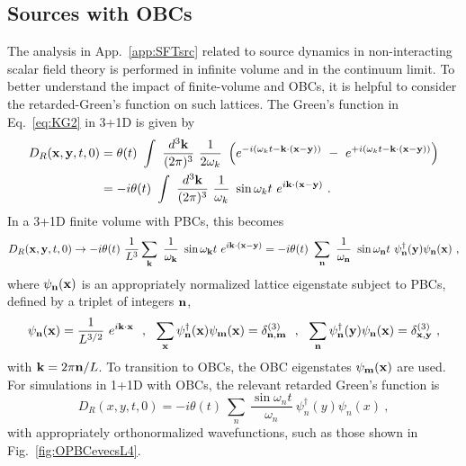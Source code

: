 \documentclass[aps, prc, tightenlines,superscriptaddress, letterpaper, amsmath, amssymb, preprintnumbers, floatfix, longbibliography, nofootinbib]{revtex4-2}
\begin{document}
\subsection{Sources with OBCs}
\label{app:OBCSMsrcs}
\noindent
The analysis in App.~\ref{app:SFTsrc} related to source dynamics in non-interacting scalar field theory is performed in infinite volume and in the continuum limit.
To better understand the impact of finite-volume and OBCs, it is helpful to consider the retarded-Green's function on such lattices.
The Green's function in Eq.~\eqref{eq:KG2} in 3+1D is given by 
%
\begin{align}
D_R({\bf x},{\bf y},t,0) & =
\theta(t)\ 
\int\ \frac{d^3{\bf k}}{(2\pi)^3}\ \frac{1}{2\omega_k}\ 
\left(
e^{-i \left( \omega_k t - {\bf k}\cdot ({\bf x}-{\bf y}) \right)}
\ -\ 
e^{+i \left( \omega_k t - {\bf k}\cdot ({\bf x}-{\bf y}) \right)}
\right)
\nonumber\\
& = - i \theta(t)\ 
\int\ \frac{d^3{\bf k}}{(2\pi)^3}\ \frac{1}{\omega_k}\ 
\sin \omega_k t\ 
e^{i  {\bf k}\cdot ({\bf x}-{\bf y}) } \ .
    \label{eq:GROBC1}
\end{align}
%
In a 3+1D finite volume with PBCs, this becomes
%
\begin{equation}
D_R({\bf x},{\bf y},t,0) \rightarrow 
- i \theta(t)\ 
\frac{1}{L^3} \sum_{\bf k}
\ \frac{1}{\omega_{\bf k}}\ 
\sin \omega_{\bf k} t\ 
e^{i  {\bf k}\cdot ({\bf x}-{\bf y}) }
 =
- i \theta(t)\ 
\sum_{\bf n}
\ \frac{1}{\omega_{\bf n}}\ 
\sin \omega_{\bf n} t\ 
\psi_{\bf n}^\dagger({\bf y})
\psi_{\bf n}({\bf x}) \ ,
    \label{eq:GROBC2PBC}
\end{equation}
%
where $\psi_{\bf n}({\bf x})$ is an appropriately normalized lattice eigenstate subject to PBCs, defined by a triplet of integers ${\bf n}$,
%
\begin{equation}
\psi_{\bf n}({\bf x}) = \frac{1}{L^{3/2}}\ 
e^{i  {\bf k}\cdot {\bf x} }
\ \ ,\ \ 
\sum_{\bf x}
\psi_{\bf n}^\dagger({\bf x}) \psi_{\bf m}({\bf x}) = \delta^{(3)}_{{\bf n},{\bf m}}
\ \ ,\ \ 
\sum_{\bf n}
\psi_{\bf n}^\dagger({\bf y}) \psi_{\bf n}({\bf x}) = \delta^{(3)}_{{\bf x},{\bf y}} \ ,
    \label{eq:GROBC2PBCb}
\end{equation}
%
with ${\bf k}=2 \pi {\bf n}/L$.
To transition to OBCs, the OBC eigenstates $\psi_{\bf m}({\bf x})$ are used.
For simulations in 1+1D with OBCs, the relevant retarded Green's function is
%
\begin{equation}
D_R(x,y,t,0) = 
- i \theta(t)\ 
\sum_n
\ \frac{\sin \omega_n t}{\omega_n}\ 
\psi_n^\dagger(y)
\psi_n(x) \ ,
    \label{eq:GROBC2OBCa}
\end{equation}
%
with appropriately orthonormalized wavefunctions, such as those shown in Fig.~\ref{fig:OPBCevecsL4}.
\end{document}

